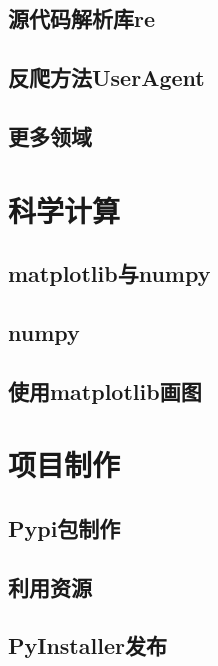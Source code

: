 \documentclass{book}
\begin{document}
\section{源代码解析库re}
\section{反爬方法UserAgent}
\section{更多领域}
\chapter{科学计算}
\section{matplotlib与numpy}
\section{numpy}
\section{使用matplotlib画图}
\chapter{项目制作}
\section{Pypi包制作}
\section{利用资源}
\section{PyInstaller发布}
\end{document}
